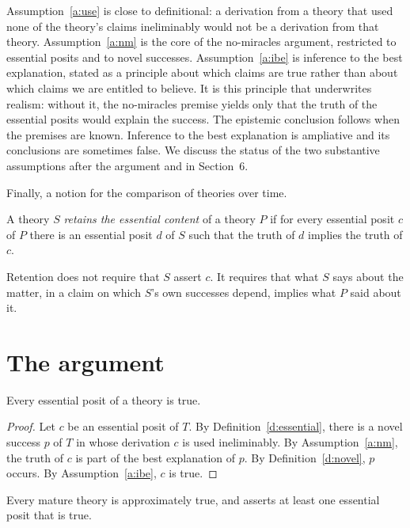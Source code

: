 \documentclass{situationist-preprint}
\begin{document}
Assumption~\ref{a:use} is close to definitional: a derivation from a theory that used none of the theory's claims ineliminably would not be a derivation from that theory. Assumption~\ref{a:nm} is the core of the no-miracles argument, restricted to essential posits and to novel successes. Assumption~\ref{a:ibe} is inference to the best explanation, stated as a principle about which claims are true rather than about which claims we are entitled to believe. It is this principle that underwrites realism: without it, the no-miracles premise yields only that the truth of the essential posits would explain the success. The epistemic conclusion follows when the premises are known. Inference to the best explanation is ampliative and its conclusions are sometimes false. We discuss the status of the two substantive assumptions after the argument and in Section~6.

Finally, a notion for the comparison of theories over time.

\begin{definition}[Retention]\label{d:retain}
A theory $S$ \emph{retains the essential content} of a theory $P$ if for every essential posit $c$ of $P$ there is an essential posit $d$ of $S$ such that the truth of $d$ implies the truth of $c$.
\end{definition}

Retention does not require that $S$ assert $c$. It requires that what $S$ says about the matter, in a claim on which $S$'s own successes depend, implies what $P$ said about it.

\section{The argument}

\begin{lemma}\label{l:true}
Every essential posit of a theory is true.
\end{lemma}

\begin{proof}
Let $c$ be an essential posit of $T$. By Definition~\ref{d:essential}, there is a novel success $p$ of $T$ in whose derivation $c$ is used ineliminably. By Assumption~\ref{a:nm}, the truth of $c$ is part of the best explanation of $p$. By Definition~\ref{d:novel}, $p$ occurs. By Assumption~\ref{a:ibe}, $c$ is true.
\end{proof}

\begin{theorem}[Realism]\label{t:realism}
Every mature theory is approximately true, and asserts at least one essential posit that is true.
\end{theorem}
\end{document}
